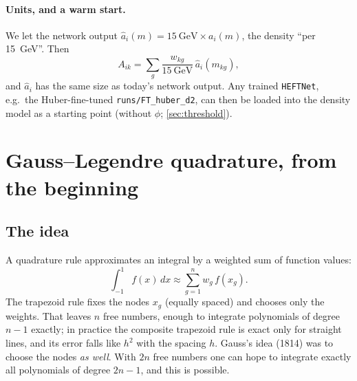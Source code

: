 \documentclass[11pt]{article}
\newcommand{\file}[1]{\nolinkurl{#1}}
\newcommand{\code}[1]{\texttt{#1}}
\begin{document}
\paragraph{Units, and a warm start.} We let the network output $\hat a_i(m) = 15~\text{GeV}\times
a_i(m)$, the density ``per 15~GeV''. Then
\begin{equation}
  A_{ik} = \sum_g \frac{w_{kg}}{15~\text{GeV}}\,\hat a_i(m_{kg}) ,
\end{equation}
and $\hat a_i$ has the same size as today's network output. Any trained \code{HEFTNet}, e.g.\ the
Huber-fine-tuned \file{runs/FT_huber_d2}, can then be loaded into the density model as a
starting point (without $\phi$; \cref{sec:threshold}).

\section{Gauss--Legendre quadrature, from the beginning}
\label{sec:gl}

\subsection{The idea}

A quadrature rule approximates an integral by a weighted sum of function values:
\begin{equation}
  \int_{-1}^{1} f(x)\,dx \approx \sum_{g=1}^{n} w_g\, f(x_g).
\end{equation}
The trapezoid rule fixes the nodes $x_g$ (equally spaced) and chooses only the weights. That
leaves $n$ free numbers, enough to integrate polynomials of degree $n-1$ exactly; in practice
the composite trapezoid rule is exact only for straight lines, and its error falls like $h^2$
with the spacing $h$. Gauss's idea (1814) was to choose the nodes \emph{as well}. With $2n$ free
numbers one can hope to integrate exactly all polynomials of degree $2n-1$, and this is possible.
\end{document}
